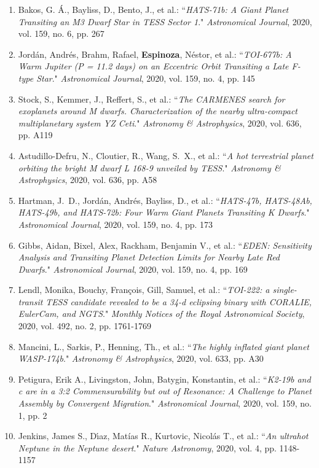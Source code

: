 \documentclass[12pt, a4paper]{article} %
\begin{document}
\begin{flushleft}
\begin{enumerate}
\item Bakos, G. Á., Bayliss, D., Bento, J., et al.: ``\textit{HATS-71b: A Giant Planet Transiting an M3 Dwarf Star in TESS Sector 1}." \textit{Astronomical Journal}, 2020, vol. 159, no. 6, pp. 267
\item Jordán, Andrés, Brahm, Rafael, \textbf{Espinoza}, Néstor, et al.: ``\textit{TOI-677b: A Warm Jupiter (P = 11.2 days) on an Eccentric Orbit Transiting a Late F-type Star}." \textit{Astronomical Journal}, 2020, vol. 159, no. 4, pp. 145
\item Stock, S., Kemmer, J., Reffert, S., et al.: ``\textit{The CARMENES search for exoplanets around M dwarfs. Characterization of the nearby ultra-compact multiplanetary system YZ Ceti}." \textit{Astronomy \& Astrophysics}, 2020, vol. 636, pp. A119
\item Astudillo-Defru, N., Cloutier, R., Wang, S.~X., et al.: ``\textit{A hot terrestrial planet orbiting the bright M dwarf L 168-9 unveiled by TESS}." \textit{Astronomy \& Astrophysics}, 2020, vol. 636, pp. A58
\item Hartman, J.~D., Jordán, Andrés, Bayliss, D., et al.: ``\textit{HATS-47b, HATS-48Ab, HATS-49b, and HATS-72b: Four Warm Giant Planets Transiting K Dwarfs}." \textit{Astronomical Journal}, 2020, vol. 159, no. 4, pp. 173
\item Gibbs, Aidan, Bixel, Alex, Rackham, Benjamin V., et al.: ``\textit{EDEN: Sensitivity Analysis and Transiting Planet Detection Limits for Nearby Late Red Dwarfs}." \textit{Astronomical Journal}, 2020, vol. 159, no. 4, pp. 169
\item Lendl, Monika, Bouchy, François, Gill, Samuel, et al.: ``\textit{TOI-222: a single-transit TESS candidate revealed to be a 34-d eclipsing binary with CORALIE, EulerCam, and NGTS}." \textit{Monthly Notices of the Royal Astronomical Society}, 2020, vol. 492, no. 2, pp. 1761-1769
\item Mancini, L., Sarkis, P., Henning, Th., et al.: ``\textit{The highly inflated giant planet WASP-174b}." \textit{Astronomy \& Astrophysics}, 2020, vol. 633, pp. A30
\item Petigura, Erik A., Livingston, John, Batygin, Konstantin, et al.: ``\textit{K2-19b and c are in a 3:2 Commensurability but out of Resonance: A Challenge to Planet Assembly by Convergent Migration}." \textit{Astronomical Journal}, 2020, vol. 159, no. 1, pp. 2
\item Jenkins, James S., Dı́az, Mat\'ias R., Kurtovic, Nicolás T., et al.: ``\textit{An ultrahot Neptune in the Neptune desert}." \textit{Nature Astronomy}, 2020, vol. 4, pp. 1148-1157

\end{enumerate}
\end{flushleft}
\end{document}
